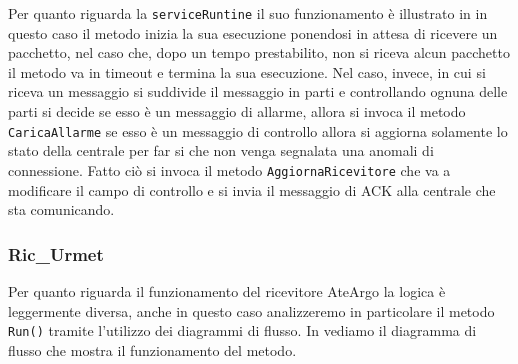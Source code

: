 Per quanto riguarda la \texttt{serviceRuntine} il suo funzionamento è illustrato in  in questo caso il metodo inizia la sua esecuzione ponendosi in attesa di ricevere un pacchetto, nel caso che, dopo un tempo prestabilito, non si riceva alcun pacchetto il metodo va in timeout e termina la sua esecuzione.
Nel caso, invece, in cui si riceva un messaggio si suddivide il messaggio in parti e controllando ognuna delle parti si decide se esso è un messaggio di allarme, allora si invoca il metodo \texttt{CaricaAllarme} se esso è un messaggio di controllo allora si aggiorna solamente lo stato della centrale per far si che non venga segnalata una anomali di connessione. Fatto ciò si invoca il metodo \texttt{AggiornaRicevitore} che va a modificare il campo di controllo e si invia il messaggio di ACK alla centrale che sta comunicando.
\subsubsection{Ric\_Urmet}\label{algourmet}
Per quanto riguarda il funzionamento del ricevitore AteArgo la logica è leggermente diversa, anche in questo caso analizzeremo in particolare il metodo \texttt{Run()} tramite l'utilizzo dei diagrammi di flusso. In  vediamo il diagramma di flusso che mostra il funzionamento del metodo.
